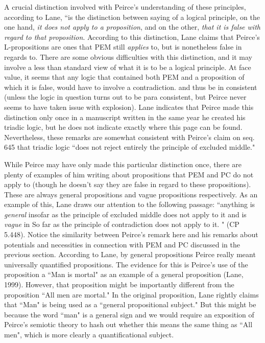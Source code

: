\documentclass[12pt]{article}
\begin{document}
A crucial distinction involved with Peirce's understanding of these principles, according to Lane, ``is the distinction between saying of a logical principle, on the one hand, \textit{it does not apply to a proposition}, and on the other, \textit{that it is false with regard to that proposition}. According to this distinction, Lane claims that Peirce's L-propositions are ones that PEM still \textit{applies} to, but is nonetheless false in regards to. There are some obvious difficulties with this distinction, and it may involve a less than standard view of what it is to be a logical principle. At face value, it seems that any logic that contained both PEM and a proposition of which it is false, would have to involve a contradiction. and thus be in consistent (unless the logic in question turns out to be para consistent, but Peirce never seems to have taken issue with explosion). Lane indicates that Peirce made this distinction only once in a manuscript written in the same year he created his triadic logic, but he does not indicate exactly where this page can be found. Nevertheless, these remarks are somewhat consistent with Peirce's claim on seq. 645 that triadic logic ``does not reject entirely the principle of excluded middle."

While Peirce may have only made this particular distinction once, there are plenty of examples of him writing about propositions that PEM and PC do not apply to (though he doesn't say they are false in regard to these propositions). These are always general propositions and vague propositions respectively. As an example of this, Lane draws our attention to the following passage: ``anything is \textit{general} insofar as the principle of excluded middle does not apply to it and is \textit{vague} in So far as the principle of contradiction does not apply to it. " (CP 5.448). Notice the similarity between Peirce's remark here and his remarks about potentials and necessities in connection with PEM and PC discussed in the previous section. According to Lane, by general propositions Peirce really meant universally quantified propositions. The evidence for this is Peirce's use of the proposition a ``Man is mortal" as an example of a general proposition (Lane, 1999). However, that proposition might be importantly different from the proposition ``All men are mortal." In the original proposition, Lane rightly claims that ``Man" is being used as a ``general propositional subject." But this might be because the word ``man" is a general sign and we would require an exposition of Peirce's semiotic theory to hash out whether this means the same thing as ``All men", which is more clearly a quantificational subject.
\end{document}
